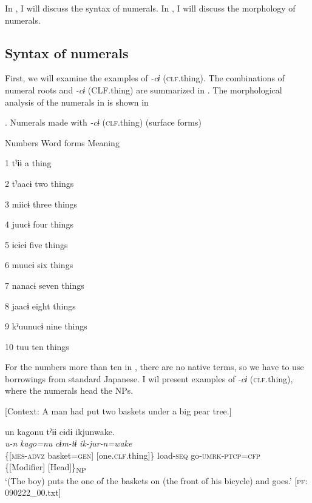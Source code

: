   In , I will discuss the syntax of numerals. In , I will discuss the morphology of numerals.

\subsection{Syntax of numerals}

First, we will examine the examples of \textit{{}-cɨ} (\textsc{clf}.thing). The combinations of numeral roots and \textit{{}-cɨ} (CLF.thing) are summarized in . The morphological analysis of the numerals in  is shown in 

\begin{styleBeschriftung}
\textmd{}\textmd{. Numerals made with}\textmd{ \textit{-cɨ}}\textmd{ (\textsc{clf}.thing) (surface forms)}
\end{styleBeschriftung}

Numbers  Word forms  Meaning

1  tˀɨɨ  a thing

2  tˀaacɨ  two things

3  miicɨ  three things

4  juucɨ  four things

5  ɨcɨcɨ  five things

6  muucɨ  six things

7  nanacɨ  seven things

8  jaacɨ  eight things

9  kˀuunucɨ  nine things

10  tuu  ten things

For the numbers more than ten in , there are no native terms, so we have to use borrowings from standard Japanese. I wil present examples of \textit{{}-cɨ} (\textsc{clf}.thing), where the numerals head the NPs.

\ea \label{ex:7:12}
\ea \label{ex:7:12a} [Context: A man had put two baskets under a big pear tree.]

\gllll  un  kagonu  tˀɨɨ  cɨdɨ   ikjunwake.\\
\textit{u-n}  \textit{kago=nu}  \textit{}  \textit{cɨm-tɨ} \textit{ik-jur-n=wake}\\
\{[\textsc{mes}-\textsc{advz}  basket=\textsc{gen}]  [one.\textsc{clf}.thing]\}  load-\textsc{seq}          go-\textsc{umrk}-\textsc{ptcp}=\textsc{cfp}\\
\{[Modifier]    [Head]\}\textsubscript{NP}  \\
\glt ‘(The boy) puts the one of the baskets on (the front of his bicycle) and goes.’ [\textsc{pf}: 090222\_00.txt]


